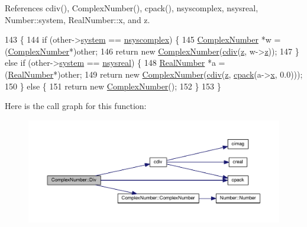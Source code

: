 References cdiv(), Complex\+Number(), cpack(), nsyscomplex, nsysreal, Number\+::system, Real\+Number\+::x, and z.


\begin{DoxyCode}
143 \{
144     \textcolor{keywordflow}{if} (other->\hyperlink{structNumber_a2ceda5601c42288626e76b06878e7476}{system} == \hyperlink{numb_8h_a1475a201d2346881ce88dfbacf628c7da3b38c947375a3db3a4bc184a11c8ee42}{nsyscomplex}) \{
145         \hyperlink{structComplexNumber}{ComplexNumber} *w = (\hyperlink{structComplexNumber}{ComplexNumber}*)other;
146         \textcolor{keywordflow}{return} \textcolor{keyword}{new} \hyperlink{structComplexNumber_a610e9db9ff0ddb0140e30d235ab64e44}{ComplexNumber}(\hyperlink{complex_8h_ace985b5f12a681b496bd3ae5f8a966b4}{cdiv}(\hyperlink{structComplexNumber_a5f72da71f4ce0d88076a391369239042}{z}, w->\hyperlink{structComplexNumber_a5f72da71f4ce0d88076a391369239042}{z}));
147     \} \textcolor{keywordflow}{else}  \textcolor{keywordflow}{if} (other->\hyperlink{structNumber_a2ceda5601c42288626e76b06878e7476}{system} == \hyperlink{numb_8h_a1475a201d2346881ce88dfbacf628c7dae72cf8673109b15268d1c0837e8bff86}{nsysreal}) \{
148         \hyperlink{structRealNumber}{RealNumber} *a = (\hyperlink{structRealNumber}{RealNumber}*)other;
149         \textcolor{keywordflow}{return} \textcolor{keyword}{new} \hyperlink{structComplexNumber_a610e9db9ff0ddb0140e30d235ab64e44}{ComplexNumber}(\hyperlink{complex_8h_ace985b5f12a681b496bd3ae5f8a966b4}{cdiv}(\hyperlink{structComplexNumber_a5f72da71f4ce0d88076a391369239042}{z}, \hyperlink{complex_8h_a980e6e049f7902b05fc9eb5614b07a5c}{cpack}(a->\hyperlink{structRealNumber_ac33d80bee75448490199a0aa48ccce1e}{x}, 0.0)));
150     \} \textcolor{keywordflow}{else} \{
151         \textcolor{keywordflow}{return} \textcolor{keyword}{new} \hyperlink{structComplexNumber_a610e9db9ff0ddb0140e30d235ab64e44}{ComplexNumber}();
152     \}
153 \}
\end{DoxyCode}


Here is the call graph for this function\+:
\nopagebreak
\begin{figure}[H]
\begin{center}
\leavevmode
\includegraphics[width=350pt]{db/d8e/structComplexNumber_a78f07b5e0e9d481629e3814b6037522b_cgraph}
\end{center}
\end{figure}



